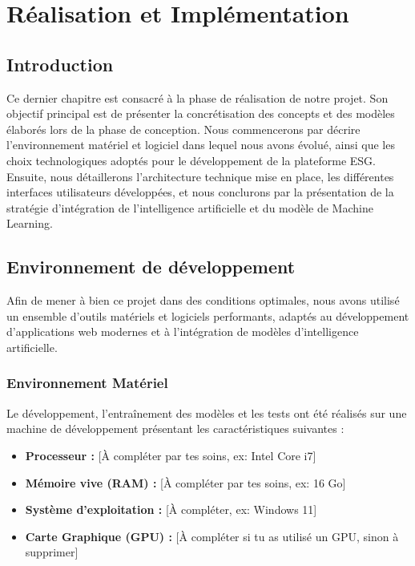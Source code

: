 \chapter{Réalisation et Implémentation}

\section{Introduction}
Ce dernier chapitre est consacré à la phase de réalisation de notre projet. Son objectif principal est de présenter la concrétisation des concepts et des modèles élaborés lors de la phase de conception. Nous commencerons par décrire l'environnement matériel et logiciel dans lequel nous avons évolué, ainsi que les choix technologiques adoptés pour le développement de la plateforme ESG. Ensuite, nous détaillerons l'architecture technique mise en place, les différentes interfaces utilisateurs développées, et nous conclurons par la présentation de la stratégie d'intégration de l'intelligence artificielle et du modèle de Machine Learning.

\section{Environnement de développement}
Afin de mener à bien ce projet dans des conditions optimales, nous avons utilisé un ensemble d'outils matériels et logiciels performants, adaptés au développement d'applications web modernes et à l'intégration de modèles d'intelligence artificielle.

\subsection{Environnement Matériel}
Le développement, l'entraînement des modèles et les tests ont été réalisés sur une machine de développement présentant les caractéristiques suivantes :
\begin{itemize}
    \item \textbf{Processeur :} [À compléter par tes soins, ex: Intel Core i7]
    \item \textbf{Mémoire vive (RAM) :} [À compléter par tes soins, ex: 16 Go]
    \item \textbf{Système d'exploitation :} [À compléter, ex: Windows 11]
    \item \textbf{Carte Graphique (GPU) :} [À compléter si tu as utilisé un GPU, sinon à supprimer]
\end{itemize}

